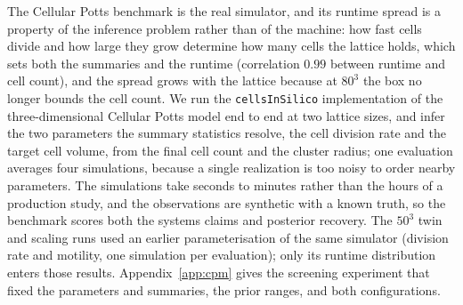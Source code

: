 \documentclass[10pt]{article}
\theoremstyle{plain}
\theoremstyle{definition}
\begin{document}
The Cellular Potts benchmark is the real simulator, and its runtime spread is a property of the inference problem rather than of the machine: how fast cells divide and how large they grow determine how many cells the lattice holds, which sets both the summaries and the runtime (correlation $0.99$ between runtime and cell count), and the spread grows with the lattice because at $80^3$ the box no longer bounds the cell count. We run the \texttt{cellsInSilico} implementation \citep{berghoff2020cis} of the three-dimensional Cellular Potts model \citep{graner1992cpm} end to end at two lattice sizes, and infer the two parameters the summary statistics resolve, the cell division rate and the target cell volume, from the final cell count and the cluster radius; one evaluation averages four simulations, because a single realization is too noisy to order nearby parameters. The simulations take seconds to minutes rather than the hours of a production study, and the observations are synthetic with a known truth, so the benchmark scores both the systems claims and posterior recovery. The $50^3$ twin and scaling runs used an earlier parameterisation of the same simulator (division rate and motility, one simulation per evaluation); only its runtime distribution enters those results. Appendix~\ref{app:cpm} gives the screening experiment that fixed the parameters and summaries, the prior ranges, and both configurations.
\end{document}
